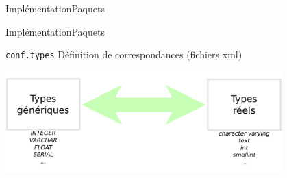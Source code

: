 \begin{frame}{Implémentation}{Paquets}
\begin{center}
\end{center}
\end{frame}

\begin{frame}{Implémentation}{Paquets}
	\begin{block}{\texttt{conf.types}}
	Définition de correspondances (fichiers xml)
	\begin{center}
		\includegraphics[width=0.8\textwidth]{files/generic_types}	
	\end{center}
	\end{block}
\end{frame}